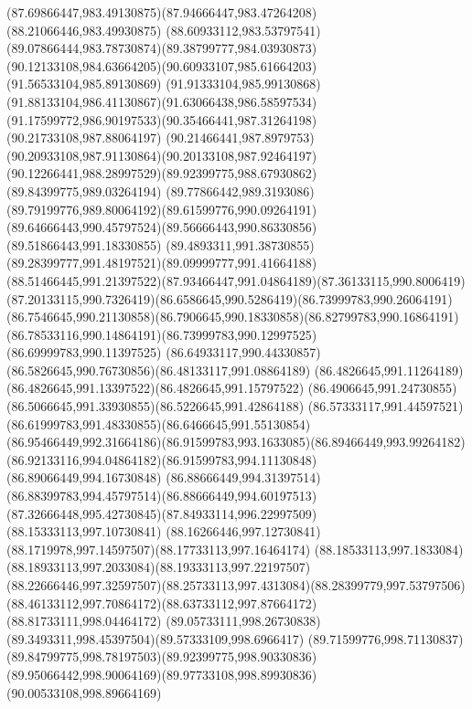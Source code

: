 {    \curveto(87.69866447,983.49130875)(87.94666447,983.47264208)(88.21066446,983.49930875)
    \curveto(88.60933112,983.53797541)(89.07866444,983.78730874)(89.38799777,984.03930873)
    \curveto(90.12133108,984.63664205)(90.60933107,985.61664203)(91.56533104,985.89130869)
    \curveto(91.91333104,985.99130868)(91.88133104,986.41130867)(91.63066438,986.58597534)
    \curveto(91.17599772,986.90197533)(90.35466441,987.31264198)(90.21733108,987.88064197)
    \curveto(90.21466441,987.8979753)(90.20933108,987.91130864)(90.20133108,987.92464197)
    \curveto(90.12266441,988.28997529)(89.92399775,988.67930862)(89.84399775,989.03264194)
    \curveto(89.77866442,989.3193086)(89.79199776,989.80064192)(89.61599776,990.09264191)
    \curveto(89.64666443,990.45797524)(89.56666443,990.86330856)(89.51866443,991.18330855)
    \curveto(89.4893311,991.38730855)(89.28399777,991.48197521)(89.09999777,991.41664188)
    \curveto(88.51466445,991.21397522)(87.93466447,991.04864189)(87.36133115,990.8006419)
    \curveto(87.20133115,990.7326419)(86.6586645,990.5286419)(86.73999783,990.26064191)
    \curveto(86.7546645,990.21130858)(86.7906645,990.18330858)(86.82799783,990.16864191)
    \curveto(86.78533116,990.14864191)(86.73999783,990.12997525)(86.69999783,990.11397525)
    \curveto(86.64933117,990.44330857)(86.5826645,990.76730856)(86.48133117,991.08864189)
    \curveto(86.4826645,991.11264189)(86.4826645,991.13397522)(86.4826645,991.15797522)
    \curveto(86.4906645,991.24730855)(86.5066645,991.33930855)(86.5226645,991.42864188)
    \curveto(86.57333117,991.44597521)(86.61999783,991.48330855)(86.6466645,991.55130854)
    \curveto(86.95466449,992.31664186)(86.91599783,993.1633085)(86.89466449,993.99264182)
    \curveto(86.92133116,994.04864182)(86.91599783,994.11130848)(86.89066449,994.16730848)
    \curveto(86.88666449,994.31397514)(86.88399783,994.45797514)(86.88666449,994.60197513)
    \curveto(87.32666448,995.42730845)(87.84933114,996.22997509)(88.15333113,997.10730841)
    \curveto(88.16266446,997.12730841)(88.1719978,997.14597507)(88.17733113,997.16464174)
    \curveto(88.18533113,997.1833084)(88.18933113,997.2033084)(88.19333113,997.22197507)
    \curveto(88.22666446,997.32597507)(88.25733113,997.4313084)(88.28399779,997.53797506)
    \curveto(88.46133112,997.70864172)(88.63733112,997.87664172)(88.81733111,998.04464172)
    \curveto(89.05733111,998.26730838)(89.3493311,998.45397504)(89.57333109,998.6966417)
    \curveto(89.71599776,998.71130837)(89.84799775,998.78197503)(89.92399775,998.90330836)
    \curveto(89.95066442,998.90064169)(89.97733108,998.89930836)(90.00533108,998.89664169)
}
